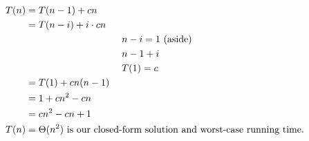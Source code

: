\documentclass{article}
\begin{document}
\begin{equation*}
\begin{split}
    T(n) &= T(n-1) + cn \\
        &= T(n-i) + i \cdot cn\\
    & \hspace{35mm} n - i = 1 \text{ (aside)}\\
    & \hspace{35mm} n - 1 + i \\
    & \hspace{35mm} T(1) = c \\
        &= T(1) + cn(n-1)\\
        &= 1 + cn^{2} - cn\\
        &= cn^{2} - cn + 1\\
    T(n) &= \Theta{(n^2)} \text{ is our closed-form solution and worst-case running time.}
\end{split}
\end{equation*}
\end{document}
